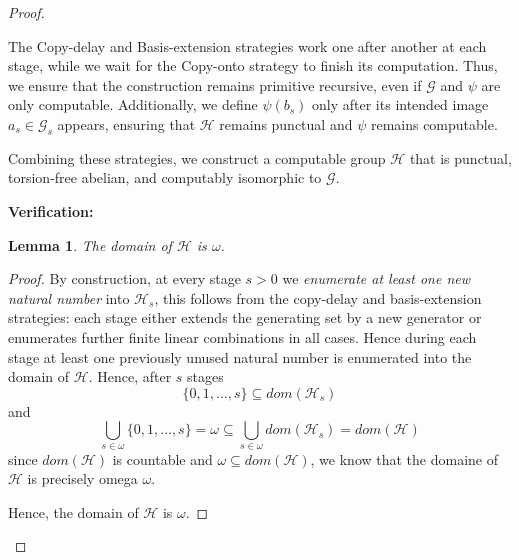 \documentclass{pracalicmgr2025}
\theoremstyle{plain}            %
\newtheorem{lemma}[theorem]{Lemma}
\theoremstyle{remark}           %
\theoremstyle{definition}       %
\begin{document}
\begin{proof}
\begin{itemize}
\end{itemize}

The Copy-delay and Basis-extension strategies work one after another at each stage, while we wait for the Copy-onto strategy to finish its computation. Thus, we ensure that the construction remains primitive recursive, even if $\mathcal{G}$ and $\psi$ are only computable. Additionally, we define $\psi(b_s)$ only after its intended image $a_s \in \mathcal{G}_s$ appears, ensuring that $\mathcal{H}$ remains punctual and $\psi$ remains computable.

Combining these strategies, we construct a computable group $\mathcal{H}$ that is punctual, torsion-free abelian, and computably isomorphic to $\mathcal{G}$.

\noindent\textbf{Verification:}

\begin{lemma} \label{torsion free lemma dom p.r}
        The domain of $\mathcal{H}$ is $\omega$.
\end{lemma}
\begin{proof}
 By construction, at every stage $s > 0$ we \emph{enumerate at least one new natural number} into $\mathcal{H}_s$, this follows from the copy-delay and basis-extension strategies: each stage either extends the generating set by a new generator or enumerates further finite linear combinations in all cases. Hence during each stage at least one previously unused natural number is enumerated into the domain of $\mathcal{H}$. Hence, after $s$ stages
 $$\{0,1,\dots,s\} \subseteq dom(\mathcal{H}_s)$$
 and 
 $$\bigcup_{s\in\omega}\{0,1,\dots,s\} = \omega \subseteq \bigcup_{s \in \omega}dom(\mathcal{H}_s) =dom(\mathcal{H})$$
 since $dom(\mathcal{H})$ is countable and $\omega \subseteq dom(\mathcal{H})$, we know that the domaine of $\mathcal{H}$ is precisely omega $\omega$.

    Hence, the domain of $\mathcal{H}$ is $\omega$. 
\end{proof}




\end{proof}
\end{document}
